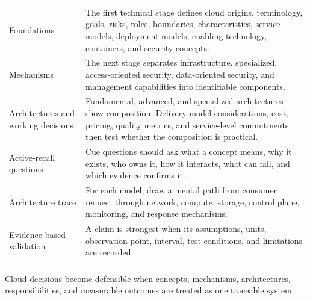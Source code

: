 \documentclass[11pt]{article}
\begin{document}
\begin{longtable}{@{}>{\RaggedRight\arraybackslash}p{}>{\RaggedRight\arraybackslash}p{}@{}}
Foundations & The first technical stage defines cloud origins, terminology, goals, risks, roles, boundaries, characteristics, service models, deployment models, enabling technology, containers, and security concepts. \\\addlinespace[2pt]
Mechanisms & The next stage separates infrastructure, specialized, access-oriented security, data-oriented security, and management capabilities into identifiable components. \\\addlinespace[2pt]
Architectures and working decisions & Fundamental, advanced, and specialized architectures show composition. Delivery-model considerations, cost, pricing, quality metrics, and service-level commitments then test whether the composition is practical. \\\addlinespace[2pt]
Active-recall questions & Cue questions should ask what a concept means, why it exists, who owns it, how it interacts, what can fail, and which evidence confirms it. \\\addlinespace[2pt]
Architecture trace & For each model, draw a mental path from consumer request through network, compute, storage, control plane, monitoring, and response mechanisms. \\\addlinespace[2pt]
Evidence-based validation & A claim is strongest when its assumptions, units, observation point, interval, test conditions, and limitations are recorded. \\\addlinespace[2pt]
\bottomrule
\end{longtable}
\begin{takeawaybox}
Cloud decisions become defensible when concepts, mechanisms, architectures, responsibilities, and measurable outcomes are treated as one traceable system.
\end{takeawaybox}
\end{document}
